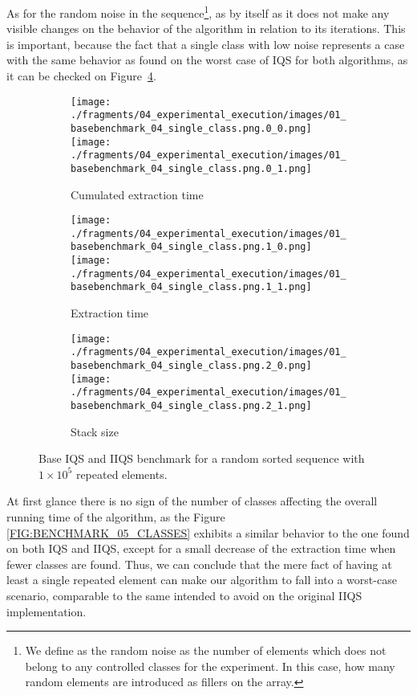 As for the random noise in the sequence\footnote{We define as the random noise as the number of elements which does not belong to any controlled classes for the experiment. In this case, how many random elements are introduced as fillers on the array.}, as by itself as it does not make any visible changes on the behavior of the algorithm in relation to its iterations. This is important, because the fact that a single class with low noise represents a case with the same behavior as found on the worst case of IQS for both algorithms, as it can be checked on Figure~\ref{FIG:BENCHMARK_04_SINGLE_CLASS}.\\


\begin{figure}
    \centering
    \begin{subfigure}[b]{\textwidth}
        \centering
        \texttt{[image: ./fragments/04\_experimental\_execution/images/01\_basebenchmark\_04\_single\_class.png.0\_0.png]}
        \texttt{[image: ./fragments/04\_experimental\_execution/images/01\_basebenchmark\_04\_single\_class.png.0\_1.png]}
        \caption{Cumulated extraction time}
        \label{FIG:BENCHMARK_04_SINGLE_CLASS__0_0}
    \end{subfigure}

    \begin{subfigure}[b]{\textwidth}
        \centering
        \texttt{[image: ./fragments/04\_experimental\_execution/images/01\_basebenchmark\_04\_single\_class.png.1\_0.png]}
        \texttt{[image: ./fragments/04\_experimental\_execution/images/01\_basebenchmark\_04\_single\_class.png.1\_1.png]}
        \caption{Extraction time}
        \label{FIG:BENCHMARK_04_SINGLE_CLASS__0_1}
    \end{subfigure}

    \begin{subfigure}[b]{\textwidth}
        \centering
        \texttt{[image: ./fragments/04\_experimental\_execution/images/01\_basebenchmark\_04\_single\_class.png.2\_0.png]}
        \texttt{[image: ./fragments/04\_experimental\_execution/images/01\_basebenchmark\_04\_single\_class.png.2\_1.png]}
        \caption{Stack size}
        \label{FIG:BENCHMARK_04_SINGLE_CLASS__0_2}
    \end{subfigure}
    
    \caption{Base IQS and IIQS benchmark for a random sorted sequence with $1\times10^5$ repeated elements.}
    \label{FIG:BENCHMARK_04_SINGLE_CLASS}
\end{figure}

At first glance there is no sign of the number of classes affecting the overall running time of the algorithm, as the Figure \ref{FIG:BENCHMARK_05_CLASSES} exhibits a similar behavior to the one found on both IQS and IIQS, except for a small decrease of the extraction time when fewer classes are found. Thus, we can conclude that the mere fact of having at least a single repeated element can make our algorithm to fall into a worst-case scenario, comparable to the same intended to avoid on the original IIQS implementation.\\

\FloatBarrier